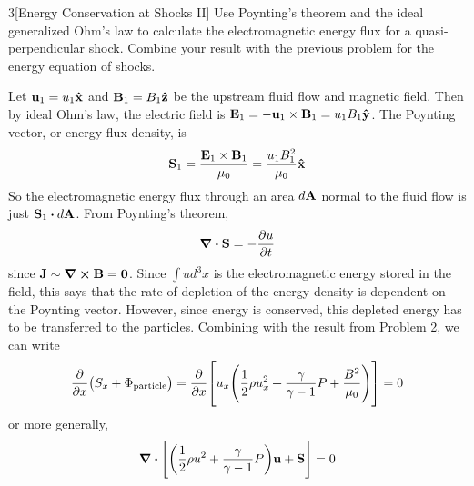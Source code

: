 \documentclass[12pt]{article}
\begin{document}
\begin{problem}{3}[Energy Conservation at Shocks II]
Use Poynting's theorem and the ideal generalized Ohm's law to calculate the
electromagnetic energy flux for a quasi-perpendicular shock. Combine your
result with the previous problem for the energy equation of shocks.
\begin{solution}
Let $\vb{u}_1=u_1\vb{\hat{x}}$ and $\vb{B}_1=B_1\vb{\hat{z}}$ be the upstream fluid flow and
magnetic field. Then by ideal Ohm's law, the electric field is
$\vb{E}_1=-\vb{u}_1\times\vb{B}_1=u_1B_1\vb{\hat{y}}$. The Poynting vector, or energy
flux density, is
\begin{equation}
    \vb{S}_1=\frac{\vb{E}_1\times\vb{B}_1}{\mu_0}=\frac{u_1B_1^2}{\mu_0}\vb{\hat{x}} 
\end{equation}
So the electromagnetic energy flux through an area $d\vb{A}$ normal to the 
fluid flow is just $\vb{S}_1\vdot d\vb{A}$. From Poynting's theorem,
\begin{equation}
    \div{\vb{S}}=-\frac{\partial u}{\partial t} 
\end{equation}
since $\vb{J}\sim\curl{\vb{B}}=\vb{0}$. Since $\int ud^3x$ is the 
electromagnetic energy stored in the field, this says that the rate of depletion
of the energy density is dependent on the Poynting vector. However, since energy
is conserved, this depleted energy has to be transferred to the particles.
Combining with the result from Problem 2, we can write
\begin{equation}
    \frac{\partial}{\partial x}\qty(S_x+\Phi_\text{particle})
    =\frac{\partial}{\partial x}\qty[u_x\qty(\frac12 \rho
    u_x^2+\frac{\gamma}{\gamma-1}P+\frac{B^2}{\mu_0})]
    =0
\end{equation}
or more generally,
\begin{equation}\label{p3:general}
    \div{\qty[\qty(\frac12\rho u^2+\frac{\gamma}{\gamma
    -1}P)\vb{u}+\vb{S}]}=0
\end{equation}
\end{solution}
\end{problem}
\end{document}
